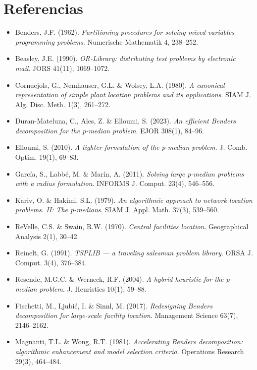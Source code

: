 \documentclass[11pt,a4paper]{article}
\theoremstyle{remark}
\begin{document}
\section*{Referencias}
\begin{itemize}\setlength\itemsep{2pt}
\item Benders, J.F. (1962). \textit{Partitioning procedures for solving mixed-variables programming problems}. Numerische Mathematik 4, 238--252.
\item Beasley, J.E. (1990). \textit{OR-Library: distributing test problems by electronic mail}. JORS 41(11), 1069--1072.
\item Cornuejols, G., Nemhauser, G.L. \& Wolsey, L.A. (1980). \textit{A canonical representation of simple plant location problems and its applications}. SIAM J. Alg. Disc. Meth. 1(3), 261--272.
\item Duran-Mateluna, C., Ales, Z. \& Elloumi, S. (2023). \textit{An efficient Benders decomposition for the p-median problem}. EJOR 308(1), 84--96.
\item Elloumi, S. (2010). \textit{A tighter formulation of the p-median problem}. J. Comb. Optim. 19(1), 69--83.
\item García, S., Labbé, M. \& Marín, A. (2011). \textit{Solving large p-median problems with a radius formulation}. INFORMS J. Comput. 23(4), 546--556.
\item Kariv, O. \& Hakimi, S.L. (1979). \textit{An algorithmic approach to network location problems. II: The p-medians}. SIAM J. Appl. Math. 37(3), 539--560.
\item ReVelle, C.S. \& Swain, R.W. (1970). \textit{Central facilities location}. Geographical Analysis 2(1), 30--42.
\item Reinelt, G. (1991). \textit{TSPLIB — a traveling salesman problem library}. ORSA J. Comput. 3(4), 376--384.
\item Resende, M.G.C. \& Werneck, R.F. (2004). \textit{A hybrid heuristic for the p-median problem}. J. Heuristics 10(1), 59--88.
\item Fischetti, M., Ljubić, I. \& Sinnl, M. (2017). \textit{Redesigning Benders decomposition for large-scale facility location}. Management Science 63(7), 2146--2162.
\item Magnanti, T.L. \& Wong, R.T. (1981). \textit{Accelerating Benders decomposition: algorithmic enhancement and model selection criteria}. Operations Research 29(3), 464--484.
\end{itemize}

\appendix

\end{document}
